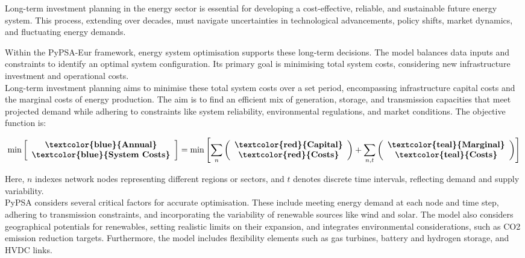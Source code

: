 Long-term investment planning in the energy sector is essential for developing a cost-effective, reliable, and sustainable future energy system. This process, extending over decades, must navigate uncertainties in technological advancements, policy shifts, market dynamics, and fluctuating energy demands. 

Within the PyPSA-Eur framework, energy system optimisation supports these long-term decisions. The model balances data inputs and constraints to identify an optimal system configuration. Its primary goal is minimising total system costs, considering new infrastructure investment and operational costs.\\

Long-term investment planning aims to minimise these total system costs over a set period, encompassing infrastructure capital costs and the marginal costs of energy production. The aim is to find an efficient mix of generation, storage, and transmission capacities that meet projected demand while adhering to constraints like system reliability, environmental regulations, and market conditions. The objective function is:

\begin{equation}
\begin{aligned}
\min \left[ \begin{array}{c}
\textbf{\textcolor{blue}{Annual}} \\
\textbf{\textcolor{blue}{System Costs}}
\end{array} \right] 
= \min \left[ \sum_{n} \left( \begin{array}{c}
\textbf{\textcolor{red}{Capital}} \\
\textbf{\textcolor{red}{Costs}}
\end{array} \right) + \sum_{n,t} \left( \begin{array}{c}
\textbf{\textcolor{teal}{Marginal}} \\
\textbf{\textcolor{teal}{Costs}}
\end{array} \right) \right]
\end{aligned}
\end{equation}

Here, \( n \) indexes network nodes representing different regions or sectors, and \( t \) denotes discrete time intervals, reflecting demand and supply variability.\\

PyPSA considers several critical factors for accurate optimisation. These include meeting energy demand at each node and time step, adhering to transmission constraints, and incorporating the variability of renewable sources like wind and solar. The model also considers geographical potentials for renewables, setting realistic limits on their expansion, and integrates environmental considerations, such as CO2 emission reduction targets. Furthermore, the model includes flexibility elements such as gas turbines, battery and hydrogen storage, and HVDC links.


